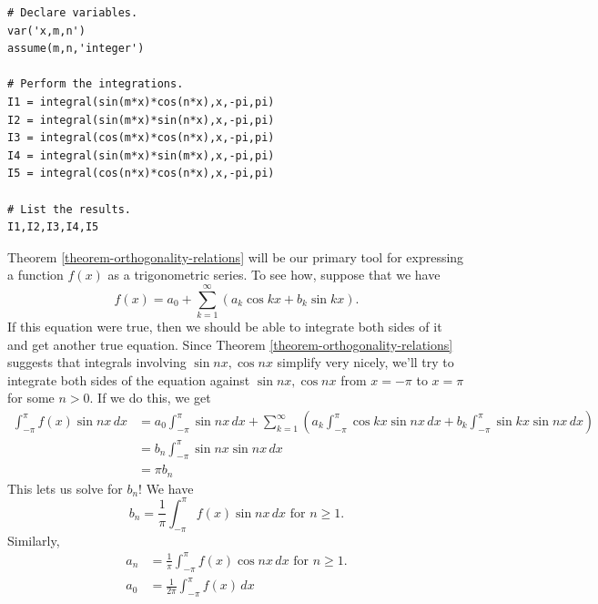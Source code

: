 \documentclass[10pt,]{book}
\theoremstyle{plain}
\theoremstyle{definition}
\theoremstyle{definition}
\numberwithin{equation}{section}
\begin{document}
\begin{lstlisting}[style=sageinput]
# Declare variables.
var('x,m,n')
assume(m,n,'integer')

# Perform the integrations.
I1 = integral(sin(m*x)*cos(n*x),x,-pi,pi)
I2 = integral(sin(m*x)*sin(n*x),x,-pi,pi)
I3 = integral(cos(m*x)*cos(n*x),x,-pi,pi)
I4 = integral(sin(m*x)*sin(m*x),x,-pi,pi)
I5 = integral(cos(n*x)*cos(n*x),x,-pi,pi)

# List the results.
I1,I2,I3,I4,I5
\end{lstlisting}
\par
Theorem \hyperref[theorem-orthogonality-relations]{\ref{theorem-orthogonality-relations}} will be our primary tool for expressing a function \(f(x)\) as a trigonometric series. To see how, suppose that we have
            \begin{equation*}f(x) = a_{0} + \sum_{k=1}^{\infty}(a_{k}\cos kx+b_{k}\sin kx).\end{equation*}
            If this equation were true, then we should be able to integrate both sides of it and get another true equation. Since Theorem \hyperref[theorem-orthogonality-relations]{\ref{theorem-orthogonality-relations}} suggests that integrals involving \(\sin nx,\cos nx\) simplify very nicely, we'll try to integrate both sides of the equation against \(\sin nx,\cos nx\) from \(x=-\pi\) to \(x=\pi\) for some \(n>0\). If we do this, we get
            \begin{align*}
\int_{-\pi}^{\pi}f(x)\sin nx\,dx & = a_{0}\int_{-\pi}^{\pi}\sin nx\,dx + \sum_{k=1}^{\infty}\left(a_{k}\int_{-\pi}^{\pi}\cos kx\sin nx\,dx + b_{k}\int_{-\pi}^{\pi}\sin kx\sin nx\,dx\right)\\
 & = b_{n}\int_{-\pi}^{\pi}\sin nx \sin nx \,dx\\
 & = \pi b_{n}
\end{align*}
            This lets us solve for \(b_{n}\)! We have
            \begin{equation*}b_{n} = \frac{1}{\pi}\int_{-\pi}^{\pi}f(x)\sin nx\,dx\text{ for $n\geq 1$.}\end{equation*}
            Similarly,
            \begin{align*}
a_{n} & = \frac{1}{\pi}\int_{-\pi}^{\pi}f(x)\cos nx\,dx\text{ for $n\geq1$.}\\
a_{0} & = \frac{1}{2\pi}\int_{-\pi}^{\pi}f(x)\,dx
\end{align*}
\end{document}
